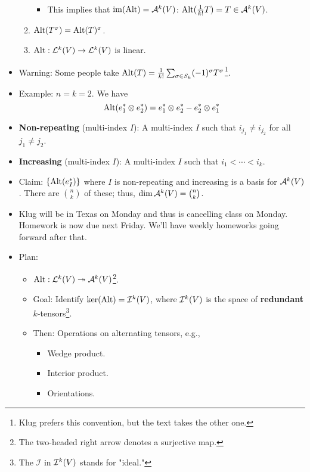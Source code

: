 \documentclass[../notes.tex]{subfiles}
\begin{document}
\begin{itemize}
\begin{enumerate}
\begin{itemize}
            \item This implies that $\im(\Alt)=\alt[k]{V}$: $\Alt(\frac{1}{k!}T)=T\in\alt[k]{V}$.
        \end{itemize}
        \item $\Alt(T^\sigma)=\Alt(T)^\sigma$.
        \item $\Alt:\lin[k]{V}\to\lin[k]{V}$ is linear.
    \end{enumerate}
    \item Warning: Some people take $\Alt(T)=\frac{1}{k!}\sum_{\sigma\in S_k}(-1)^\sigma T^\sigma$\footnote{Klug prefers this convention, but the text takes the other one.}.
    \item Example: $n=k=2$. We have
    \begin{equation*}
        \Alt(e_1^*\otimes e_2^*) = e_1^*\otimes e_2^*-e_2^*\otimes e_1^*
    \end{equation*}
    \item \textbf{Non-repeating} (multi-index $I$): A multi-index $I$ such that $i_{j_1}\neq i_{j_2}$ for all $j_1\neq j_2$.
    \item \textbf{Increasing} (multi-index $I$): A multi-index $I$ such that $i_1<\cdots<i_k$.
    \item Claim: $\{\Alt(e_I^*)\}$ where $I$ is non-repeating and increasing is a basis for $\alt[k]{V}$. There are $\binom{n}{k}$ of these; thus, $\dim\alt[k]{V}=\binom{n}{k}$.
    \item {}Klug will be in Texas on Monday and thus is cancelling class on Monday. Homework is now due next Friday. We'll have weekly homeworks going forward after that.
    \item Plan:
    \begin{itemize}
        \item $\Alt:\lin[k]{V}\twoheadrightarrow\alt[k]{V}$\footnote{The two-headed right arrow denotes a surjective map.}.
        \item Goal: Identify $\ker(\Alt)=\ide[k]{V}$, where $\ide[k]{V}$ is the space of \textbf{redundant} $k$-tensors\footnote{The $\mathcal{I}$ in $\ide[k]{V}$ stands for "ideal."}.
        \item Then: Operations on alternating tensors, e.g.,
        \begin{itemize}
            \item Wedge product.
            \item Interior product.
            \item Orientations.
        \end{itemize}

\end{itemize}
\end{itemize}
\end{document}
